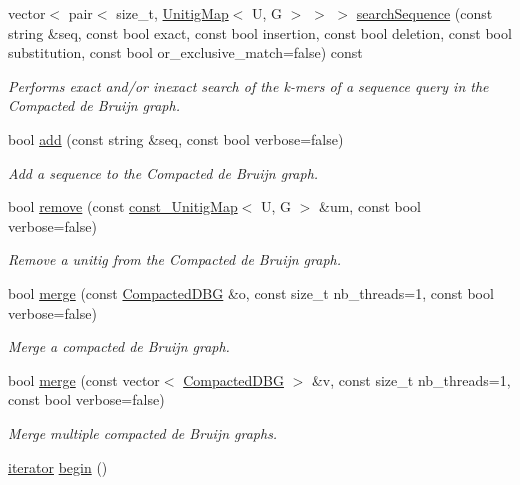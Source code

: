 \begin{DoxyCompactItemize}
vector$<$ pair$<$ size\+\_\+t, \hyperlink{classUnitigMap}{Unitig\+Map}$<$ U, G $>$ $>$ $>$ \hyperlink{classCompactedDBG_af27c7bcb26d05371bdcc12075b4724eb}{search\+Sequence} (const string \&seq, const bool exact, const bool insertion, const bool deletion, const bool substitution, const bool or\+\_\+exclusive\+\_\+match=false) const
\begin{DoxyCompactList}\small\item\em Performs exact and/or inexact search of the k-\/mers of a sequence query in the Compacted de Bruijn graph. \end{DoxyCompactList}\item 
bool \hyperlink{classCompactedDBG_a3c884106eb285d837918ddf53ca422bf}{add} (const string \&seq, const bool verbose=false)
\begin{DoxyCompactList}\small\item\em Add a sequence to the Compacted de Bruijn graph. \end{DoxyCompactList}\item 
bool \hyperlink{classCompactedDBG_aa8e901dc6f1cf0adcc91608a6b34e999}{remove} (const \hyperlink{CompactedDBG_8hpp_a631369597e56604279ba89a211c14fd0}{const\+\_\+\+Unitig\+Map}$<$ U, G $>$ \&um, const bool verbose=false)
\begin{DoxyCompactList}\small\item\em Remove a unitig from the Compacted de Bruijn graph. \end{DoxyCompactList}\item 
bool \hyperlink{classCompactedDBG_a936c3dc0ecc4c8aa28fd5b4dedd1746a}{merge} (const \hyperlink{classCompactedDBG}{Compacted\+D\+BG} \&o, const size\+\_\+t nb\+\_\+threads=1, const bool verbose=false)
\begin{DoxyCompactList}\small\item\em Merge a compacted de Bruijn graph. \end{DoxyCompactList}\item 
bool \hyperlink{classCompactedDBG_ad71daf96811e96c97be70762d1cba7d8}{merge} (const vector$<$ \hyperlink{classCompactedDBG}{Compacted\+D\+BG} $>$ \&v, const size\+\_\+t nb\+\_\+threads=1, const bool verbose=false)
\begin{DoxyCompactList}\small\item\em Merge multiple compacted de Bruijn graphs. \end{DoxyCompactList}\item 
\hyperlink{classCompactedDBG_af4a6df70628f698d9a2ee843b5359883}{iterator} \hyperlink{classCompactedDBG_aafac845b848ae5cf79f1f818db6c2ecc}{begin} ()

\end{DoxyCompactItemize}
